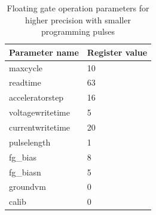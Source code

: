 \documentclass[a4paper,twocolumn,draft=true]{scrartcl}
\begin{document}
\begin{table}
\begin{tabular}{l|l}
Parameter name & Register value\\
\hline
maxcycle & 10\\
readtime & 63\\
acceleratorstep & 16\\
voltagewritetime & 5\\
currentwritetime & 20\\
pulselength & 1\\
fg\_bias & 8\\
fg\_biasn & 5\\
groundvm & 0\\
calib & 0\\
\end{tabular}
\caption{Floating gate operation parameters for higher precision with smaller programming pulses}
\label{tab:afterburn_fg_values}
\end{table}
\end{document}
